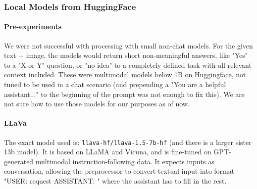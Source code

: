 \documentclass{article}
\begin{document}
\subsubsection{Local Models from HuggingFace}

\paragraph{Pre-experiments} We were not successful with processing with small non-chat models. For the given text + image, the models would return short non-meaningful answers, like "Yes" to a "X or Y" question, or "no idea" to a completely defined task with all relevant context included. These were multimodal models below 1B on Huggingface, not tuned to be used in a chat scenario (and prepending a "You are a helpful assistant..." to the beginning of the prompt was not enough to fix this). 
We are not sure how to use those models for our purposes as of now. 


\paragraph{LLaVa} The exact model used is: \texttt{llava-hf/llava-1.5-7b-hf} (and there is a larger sister 13b model). It is based on LLaMA and Vicuna, and is fine-tuned on GPT-generated multimodal instruction-following data. It expects inputs as conversation, allowing the preprocessor to convert textual input into format "USER: {request} ASSISTANT: " where the assistant has to fill in the rest. 
\end{document}
